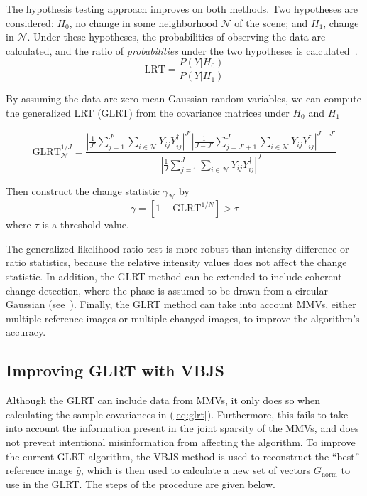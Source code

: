 \documentclass{article}
\begin{document}
The hypothesis testing approach improves on both methods. Two hypotheses are considered: $H_0$, no change in some neighborhood $\mathcal{N}$ of the scene; and $H_1$, change in $\mathcal{N}$. Under these hypotheses, the probabilities of observing the data are calculated, and the ratio of \emph{probabilities} under the two hypotheses is calculated~\cite{novak_2005}.
\begin{equation}
    \text{LRT} = \frac{P(Y | H_0)}{P(Y | H_1)}
\end{equation}

By assuming the data are zero-mean Gaussian random variables, we can compute the generalized LRT (GLRT) from the covariance matrices under $H_0$ and $H_1$

\begin{equation}\label{eq:glrt}
    \text{GLRT}^{1/J}_{\mathcal{N}} = \frac{
        \left|\frac{1}{J'} \sum_{j=1}^{J'} \sum_{i \in \mathcal{N}}
                    Y_{ij}Y_{ij}^\dagger \right|^{J'} %
        \left|\frac{1}{J-J'} \sum_{j=J'+1}^{J} \sum_{i \in \mathcal{N}}
                    Y_{ij}Y_{ij}^\dagger \right|^{J-J'}}%
        {\left|\frac{1}{J} \sum_{j=1}^J \sum_{i \in \mathcal{N}}
                    Y_{ij}Y_{ij}^\dagger \right|^J} %
\end{equation}

Then construct the change statistic $\gamma_\mathcal{N}$ by
\begin{equation}
    \gamma = \left[ 1-\text{GLRT}^{1/N} \right] > \tau
\end{equation}
where $\tau$ is a threshold value.

The generalized likelihood-ratio test is more robust than intensity difference or ratio statistics, because the relative intensity values does not affect the change statistic. In addition, the GLRT method can be extended to include coherent change detection, where the phase is assumed to be drawn from a circular Gaussian (see~\cite{Ash_2014}). Finally, the GLRT method can take into account MMVs, either multiple reference images or multiple changed images, to improve the algorithm's accuracy.

\subsection{Improving GLRT with VBJS}

Although the GLRT can include data from MMVs, it only does so when calculating the sample covariances in (\ref{eq:glrt}). Furthermore, this fails to take into account the information present in the joint sparsity of the MMVs, and does not prevent intentional misinformation from affecting the algorithm. To improve the current GLRT algorithm, the VBJS method is used to reconstruct the ``best'' reference image $\hat{g}$, which is then used to calculate a new set of vectors $G_\text{norm}$ to use in the GLRT. The steps of the procedure are given below.
\end{document}
